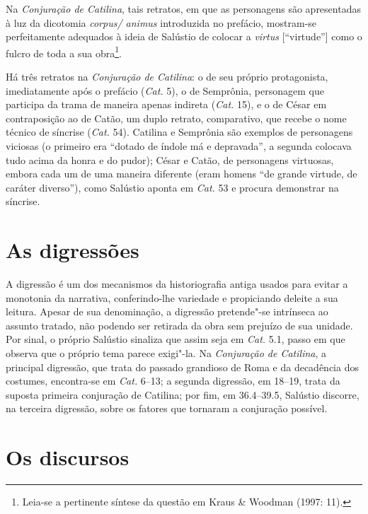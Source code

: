 Na \emph{Conjuração de Catilina}, tais retratos, em que as personagens são
apresentadas à luz da dicotomia \emph{corpus/ animus} introduzida no prefácio,
mostram-se perfeitamente adequados à ideia de Salústio de colocar a
\emph{virtus} [“virtude”] como o fulcro de toda a sua obra\footnote{Leia-se a pertinente síntese da questão em Kraus \& Woodman (1997: 11).}.  

Há três retratos na \emph{Conjuração de Catilina}: o de seu próprio
protagonista, imediatamente após o prefácio (\emph{Cat.} 5), o de Semprônia, personagem
que participa da trama de maneira apenas indireta (\emph{Cat.} 15), e o de César em
contraposição ao de Catão, um duplo retrato, comparativo, que recebe o nome
técnico de síncrise (\emph{Cat.} 54). Catilina e Semprônia são exemplos de personagens
viciosas (o primeiro era “dotado de índole má e depravada”, a segunda colocava
tudo acima da honra e do pudor); César e Catão, de personagens virtuosas,
embora cada um de uma maneira diferente (eram homens “de grande virtude, de
caráter diverso”), como Salústio aponta em \emph{Cat.} 53 e procura demonstrar na síncrise.

\section{As digressões}

A digressão é um dos mecanismos da historiografia antiga usados para evitar a
monotonia da narrativa, conferindo-lhe variedade e propiciando deleite a sua
leitura. Apesar de sua denominação, a digressão pretende"-se intrínseca ao assunto tratado, não podendo ser retirada da
obra sem prejuízo de sua unidade. Por sinal, o próprio Salústio sinaliza que
assim seja em \emph{Cat.} 5.1, passo em que observa que o próprio tema parece exigi"-la. Na
\emph{Conjuração de Catilina}, a principal digressão, que trata do passado
grandioso de Roma e da decadência dos costumes, encontra-se em \emph{Cat.} 6--13;
a segunda digressão, em 18--19, trata da suposta primeira conjuração de
Catilina; por fim, em 36.4--39.5, Salústio discorre, na terceira digressão,
sobre os fatores que tornaram a conjuração possível. 

\section{Os discursos}
 
